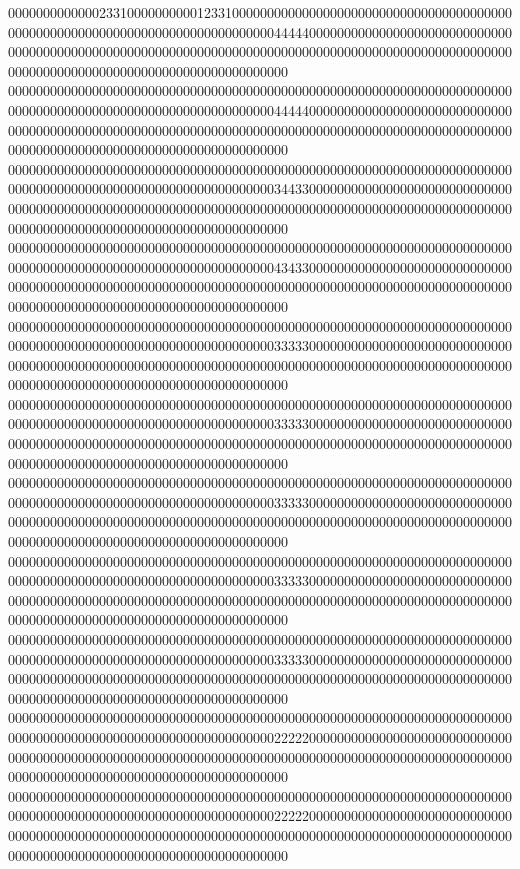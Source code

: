 0000000000000233100000000001233100000000000000000000000000000000000000000000000000000000000000000000000000000044444000000000000000000000000000000000000000000000000000000000000000000000000000000000000000000000000000000000000000000000000000000000000000000000
0000000000000000000000000000000000000000000000000000000000000000000000000000000000000000000000000000000000000044444000000000000000000000000000000000000000000000000000000000000000000000000000000000000000000000000000000000000000000000000000000000000000000000
0000000000000000000000000000000000000000000000000000000000000000000000000000000000000000000000000000000000000034433000000000000000000000000000000000000000000000000000000000000000000000000000000000000000000000000000000000000000000000000000000000000000000000
0000000000000000000000000000000000000000000000000000000000000000000000000000000000000000000000000000000000000043433000000000000000000000000000000000000000000000000000000000000000000000000000000000000000000000000000000000000000000000000000000000000000000000
0000000000000000000000000000000000000000000000000000000000000000000000000000000000000000000000000000000000000033333000000000000000000000000000000000000000000000000000000000000000000000000000000000000000000000000000000000000000000000000000000000000000000000
0000000000000000000000000000000000000000000000000000000000000000000000000000000000000000000000000000000000000033333000000000000000000000000000000000000000000000000000000000000000000000000000000000000000000000000000000000000000000000000000000000000000000000
0000000000000000000000000000000000000000000000000000000000000000000000000000000000000000000000000000000000000033333000000000000000000000000000000000000000000000000000000000000000000000000000000000000000000000000000000000000000000000000000000000000000000000
0000000000000000000000000000000000000000000000000000000000000000000000000000000000000000000000000000000000000033333000000000000000000000000000000000000000000000000000000000000000000000000000000000000000000000000000000000000000000000000000000000000000000000
0000000000000000000000000000000000000000000000000000000000000000000000000000000000000000000000000000000000000033333000000000000000000000000000000000000000000000000000000000000000000000000000000000000000000000000000000000000000000000000000000000000000000000
0000000000000000000000000000000000000000000000000000000000000000000000000000000000000000000000000000000000000022222000000000000000000000000000000000000000000000000000000000000000000000000000000000000000000000000000000000000000000000000000000000000000000000
0000000000000000000000000000000000000000000000000000000000000000000000000000000000000000000000000000000000000022222000000000000000000000000000000000000000000000000000000000000000000000000000000000000000000000000000000000000000000000000000000000000000000000
